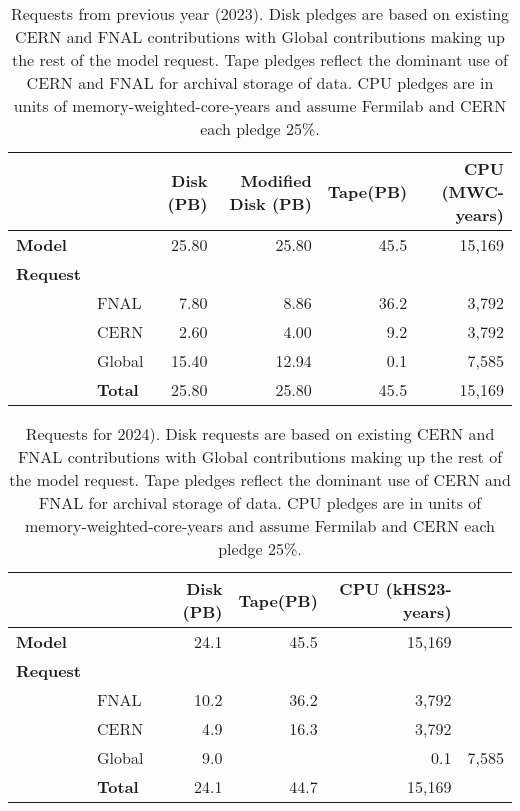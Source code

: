 \documentclass[12pt]{article}
\begin{document}
\begin{table}[ht]
\begin{centering}

\begin{tabular}{|ll|rr|r|r|}
\hline
 	&&	Disk (PB)	&	Modified Disk (PB)	&	Tape(PB)	&	CPU (MWC-years)	\\
	\hline
{\bf Model}	&&	25.80	&	25.80	&	45.5	&	15,169	\\
\hline
{\bf Request}	&&		&		&		&		\\
&FNAL	&	7.80	&	8.86	&	36.2	&	3,792	\\
&CERN	&	2.60	&	4.00	&	9.2	&	3,792	\\
&Global	&	15.40	&	12.94	&	0.1	&	7,585\\
\hline
&{\bf Total}	&	25.80	&	25.80	&	45.5	&	15,169	\\
\hline
\end{tabular}

\caption{Requests from previous year (2023).  Disk pledges are based on existing CERN and FNAL contributions with Global contributions making up the rest of the model request.  Tape pledges reflect the dominant use of CERN and FNAL for archival storage of data.  CPU pledges are in units of memory-weighted-core-years and assume Fermilab and CERN each pledge 25\%.   }
\end{centering}
\label{tab:summary2023}
\end{table}

\begin{table}[ht]
\begin{centering}

\begin{tabular}{|ll|rr|r|r|}
\hline
 	&&	Disk (PB)	&		Tape(PB)	&	CPU (kHS23-years)	\\
	\hline
{\bf Model}	&&	24.1	&		45.5	&	15,169	\\
\hline
{\bf Request}	&&		 		&		&		\\
&FNAL	&	10.2	&	 	36.2	&	3,792	\\
&CERN	&	4.9	&	 	16.3	&	3,792	\\
&Global	&	9.0	&	 &	0.1	&	7,585\\
\hline
&{\bf Total}	&	24.1	&	 	44.7	&	15,169	\\
\hline
\end{tabular}

\caption{Requests for 2024).  Disk requests are based on existing CERN and FNAL contributions with Global contributions making up the rest of the model request.  Tape pledges reflect the dominant use of CERN and FNAL for archival storage of data.  CPU pledges are in units of memory-weighted-core-years and assume Fermilab and CERN each pledge 25\%.   }
\end{centering}
\label{tab:summary2024}
\end{table}
\end{document}
